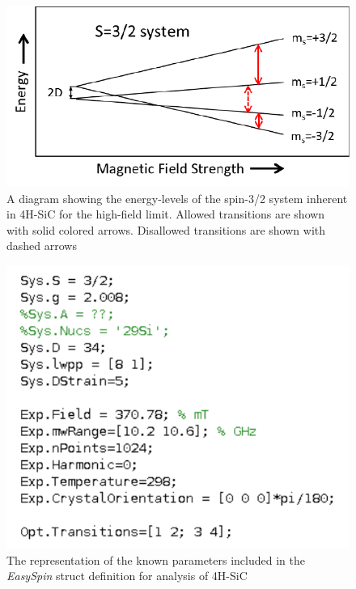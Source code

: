 \documentclass[oneside, noacknowlegments]{BYUPhys}
\begin{document}
\begin{figure}
    \centerline{\includegraphics{energy_levels_fig}}
    \caption[Energy Levels of 4H-SiC]{\label{fig:SiCEnergyLevels}
     A diagram showing the energy-levels of the spin-3/2 system inherent in 4H-SiC for the high-field limit. Allowed transitions are shown with solid colored arrows. Disallowed transitions are shown with dashed arrows}
 \end{figure}

\begin{figure}
    \centerline{\includegraphics{sic_params_commented_fig}}
    \caption[The \textit{EasySpin} Representation of SiC]{\label{fig:SiCParams}
     The representation of the known parameters included in the \textit{EasySpin} struct definition for analysis of 4H-SiC}
 \end{figure}
\end{document}
